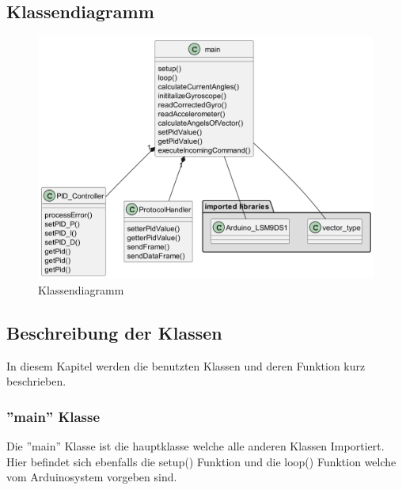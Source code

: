 \subsection{Klassendiagramm}
\begin{figure}[H]
  \begin{center}
    \includegraphics[width=0.8\linewidth]{content/diagrams/out/class/classdiagram.png}
    \caption{Klassendiagramm}
  \end{center}
\end{figure}

\subsection{Beschreibung der Klassen}
In diesem Kapitel werden die benutzten Klassen und deren Funktion kurz beschrieben.
\subsubsection{''main'' Klasse}
Die ''main'' Klasse ist die hauptklasse welche alle anderen Klassen Importiert. Hier befindet sich ebenfalls die setup() Funktion und die loop() Funktion welche vom Arduinosystem vorgeben sind.

